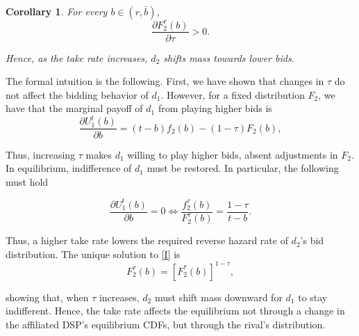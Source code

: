 \documentclass[11pt]{article}
\theoremstyle{plain}
\theoremstyle{definition}
\theoremstyle{plain}
\newtheorem{cor}[thm]{Corollary}
\theoremstyle{plain}
\theoremstyle{plain}
\theoremstyle{plain}
\numberwithin{equation}{section}
\begin{document}
\begin{cor}
For every $b\in(r,\bar b)$,
\[
\frac{\partial F_2^\tau(b)}{\partial \tau}>0.
\]

\vspace{0.4cm}

\noindent Hence, as the take rate increases, $ d_2 $ shifts mass towards lower bids.
\end{cor}

\vspace{0.4cm}

\noindent The formal intuition is the following. First, we have shown that changes in $ \tau $ do not affect the bidding behavior of $ d_1 $. However, for a fixed distribution $ F_2 $, we have that the marginal payoff of $ d_1 $ from playing higher bids is
\[
\frac{\partial U_1^t(b)}{\partial b}
=
(t-b)f_2(b)-(1-\tau)F_2(b),
\]

\vspace{0.4cm}

\noindent Thus, increasing $ \tau $ makes $ d_1 $ willing to play higher bids, absent adjustments in $ F_2 $. In equilibrium, indifference of $ d_1 $ must be restored. In particular, the following must hold

\begin{equation}\tag{I$\tau$}\label{I}
\frac{\partial U_1^t(b)}{\partial b}
= 0
\iff
\frac{f_2^\tau(b)}{F_2^\tau(b)}
=
\frac{1-\tau}{t-b}.
\end{equation}

\vspace{0.2cm}

\noindent Thus, a higher take rate lowers the required reverse hazard rate of $ d_2 $'s bid distribution. The unique solution to \eqref{I} is
\[
F_2^\tau(b)=\left[F_2^*(b)\right]^{1-\tau},
\]

\vspace{0.2cm}

\noindent showing that, when $ \tau $ increases, $ d_2 $ must shift mass downward for $ d_1 $ to stay indifferent. Hence, the take rate affects the equilibrium not through a change in the affiliated DSP's equilibrium CDFs, but through the rival's distribution.
\end{document}
